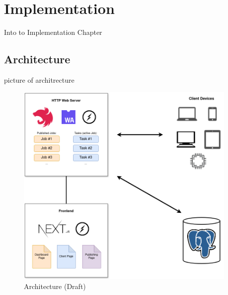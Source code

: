 \chapter{Implementation}
\label{ch:implementation}
Into to Implementation Chapter

\section{Architecture}
\label{sec:implementation:architecture}
picture of architrecture
\begin{figure}[htbp]
    \centering
    \includegraphics[width=0.95\textwidth]{gfx/figures/WebAssembly-MA.drawio.png}
    \caption{Architecture (Draft)}
    \label{fig:implementation:architecture}
\end{figure}
